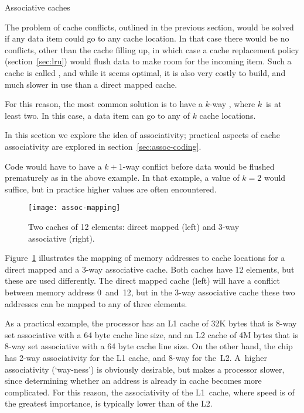  {Associative caches}
\label{sec:associative}

The problem of cache conflicts, outlined in the previous section, would
be solved if any data item could go to any cache location. In that
case there would be no conflicts, other than the cache filling up, in
which case a cache replacement policy (section~\ref{sec:lru}) would
flush data to make room for the incoming item. Such a cache is called
, and while it seems optimal, it is also
very costly to build, and much slower in use than a direct mapped cache.

For this reason, the most common solution is to have a
$k$-way , where $k$~is at least two. In
this case, a data item can go to any of $k$ cache locations.

In this section we explore the idea of associativity;
practical aspects of cache associativity are explored
in section~\ref{sec:assoc-coding}.

Code
would have to have a $k+1$-way conflict before data would be flushed
prematurely as in the above example. In that example, a value of $k=2$
would suffice, but in practice higher values are often encountered.
\begin{figure}[ht]
\texttt{[image: assoc-mapping]}
\caption{Two caches of 12 elements: direct mapped (left) and 3-way associative (right).}
\label{fig:assoc-mapping}
\end{figure}
Figure~\ref{fig:assoc-mapping} illustrates the mapping of memory
addresses to cache locations for a direct mapped and a 3-way associative
cache. Both caches have 12 elements, but these are used differently.
The direct mapped cache (left)
will have a conflict between memory address 0~and~12, but
in the 3-way associative cache these two addresses can be mapped
to any of three elements.

As a practical example, the
 processor has
an L1 cache of 32K bytes that is 8-way set associative with a 64
  byte cache line size, and
an L2 cache of 4M bytes that is 8-way set associative with a 64
  byte cache line size.
On the other hand, the  chip
has 2-way associativity for the L1 cache, and 8-way for
the~L2. A~higher associativity (`way-ness') is obviously desirable,
but makes a processor slower, since determining whether an address is
already in cache becomes more complicated. For this reason, the
associativity of the L1~cache, where speed is of the greatest
importance, is typically lower than of the L2.

